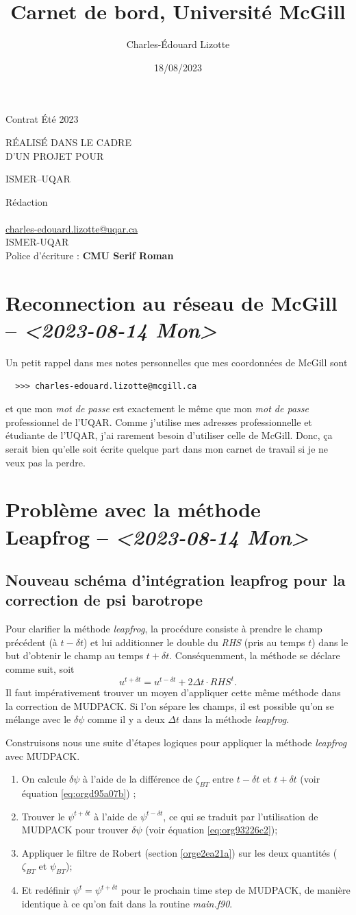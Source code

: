 \documentclass[10pt]{article}
\author{Charles-Édouard Lizotte}
\date{18/08/2023}
\title{Carnet de bord, Université McGill}
\makeatletter
\numberwithin{equation}{section}
\newcommand{\mytitlepage}{
\begin{titlepage}
\begin{center}
{\Huge \thesubtitle \par}
\vspace{2cm}
{\Huge \MakeUppercase{\thetitle} \par}
\vspace{2cm}
RÉALISÉ DANS LE CADRE\\ D'UN PROJET POUR \par
\vspace{2cm}
{\Huge ISMER--UQAR \par}
\vspace{2cm}
{\thedate}
\end{center}
\vfill
Rédaction \\
{\theauthor}\\
\url{charles-edouard.lizotte@uqar.ca}\\
ISMER-UQAR\\
Police d'écriture : \textbf{CMU Serif Roman}
\end{titlepage}
}
\newcommand{\thesubtitle}{Contrat Été 2023}
\makeatother
\begin{document}
\mytitlepage
\tableofcontents\newpage

\section{Reconnection au réseau de McGill -- \textit{<2023-08-14 Mon>}}
\label{sec:org6de5c0b}
Un petit rappel dans mes notes personnelles que mes coordonnées de McGill sont
\begin{verbatim}
  >>> charles-edouard.lizotte@mcgill.ca
\end{verbatim}
et que mon \emph{mot de passe} est exactement le même que mon \emph{mot de passe} professionnel de l'UQAR.
Comme j'utilise mes adresses professionnelle et étudiante de l'UQAR, j'ai rarement besoin d'utiliser celle de McGill.
Donc, ça serait bien qu'elle soit écrite quelque part dans mon carnet de travail si je ne veux pas la perdre.


\section{Problème avec la méthode Leapfrog -- \textit{<2023-08-14 Mon>}}
\label{sec:org1fb7cd8}

\subsection{Nouveau schéma d'intégration leapfrog pour la correction de psi barotrope}
\label{sec:orgb823847}
Pour clarifier la méthode \emph{leapfrog}, la procédure consiste à prendre le champ précédent (à \(t-\delta t\)) et lui additionner le double du \emph{RHS} (pris au temps \(t\)) dans le but d'obtenir le champ au temps \(t+\delta t\).
Conséquemment, la méthode se déclare comme suit, soit
\begin{equation}
   u^{t+\delta t} = u^{t-\delta t} + 2\Delta t\cdot RHS^t.
\end{equation}
Il faut impérativement trouver un moyen d'appliquer cette même méthode dans la correction de MUDPACK.
Si l'on sépare les champs, il est possible qu'on se mélange avec le \(\delta \psi\) comme il y a deux \(\Delta t\) dans la méthode \emph{leapfrog}.\bigskip

Construisons nous une suite d'étapes logiques pour appliquer la méthode \emph{leapfrog} avec MUDPACK.
\begin{enumerate}
\item On calcule \(\delta \psi\) à l'aide de la différence de \(\zeta_{BT}\) entre \(t-\delta t\) et \(t+\delta t\) (voir équation \ref{eq:orgd95a07b}) ;
\item Trouver le \(\psi^{t+\delta t}\) à l'aide de \(\psi^{t-\delta t}\), ce qui se traduit par l'utilisation de MUDPACK pour trouver \(\delta \psi\) (voir équation \ref{eq:org93226c2});
\item Appliquer le filtre de Robert (section \ref{orge2ea21a})  sur les deux quantités (\(\zeta_{BT}\) et \(\psi_{BT}\));
\item Et redéfinir \(\psi^t = \psi^{t+\delta t}\) pour le prochain time step de MUDPACK, de manière identique à ce qu'on fait dans la routine \emph{main.f90}.
\end{enumerate}
\end{document}
